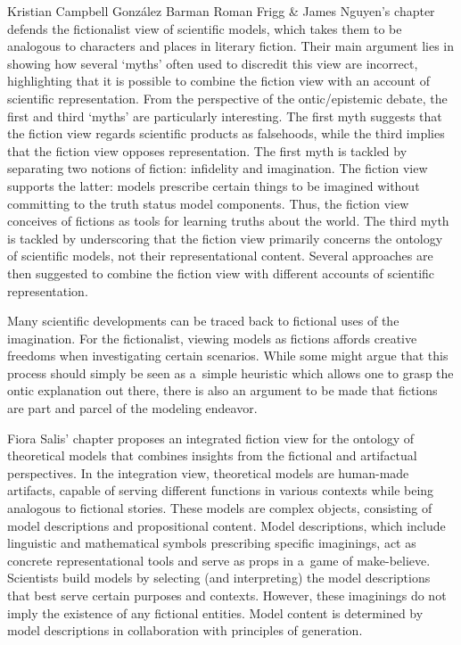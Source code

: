 \begin{recengenv}{Kristian Campbell González Barman}
Roman Frigg \& James Nguyen's chapter defends the fictionalist view of scientific models, which takes them to be analogous to characters and places in literary fiction. Their main argument lies in showing how several ‘myths' often used to discredit this view are incorrect, highlighting that it is possible to combine the fiction view with an account of scientific representation. From the perspective of the ontic/epistemic debate, the first and third ‘myths' are particularly interesting. The first myth suggests that the fiction view regards scientific products as falsehoods, while the third implies that the fiction view opposes representation. The first myth is tackled by separating two notions of fiction: infidelity and imagination. The fiction view supports the latter: models prescribe certain things to be imagined without committing to the truth status model components. Thus, the fiction view conceives of fictions as tools for learning truths about the world. The third myth is tackled by underscoring that the fiction view primarily concerns the ontology of scientific models, not their representational content. Several approaches are then suggested to combine the fiction view with different accounts of scientific representation.

Many scientific developments can be traced back to fictional uses of the imagination. For the fictionalist, viewing models as fictions affords creative freedoms when investigating certain scenarios. While some might argue that this process should simply be seen as a~simple heuristic which allows one to grasp the ontic explanation out there, there is also an argument to be made that fictions are part and parcel of the modeling endeavor.

Fiora Salis' chapter proposes an integrated fiction view for the ontology of theoretical models that combines insights from the fictional and artifactual perspectives. In the integration view, theoretical models are human-made artifacts, capable of serving different functions in various contexts while being analogous to fictional stories. These models are complex objects, consisting of model descriptions and propositional content. Model descriptions, which include linguistic and mathematical symbols prescribing specific imaginings, act as concrete representational tools and serve as props in a~game of make-believe. Scientists build models by selecting (and interpreting) the model descriptions that best serve certain purposes and contexts. However, these imaginings do not imply the existence of any fictional entities. Model content is determined by model descriptions in collaboration with principles of generation.


\end{recengenv}
